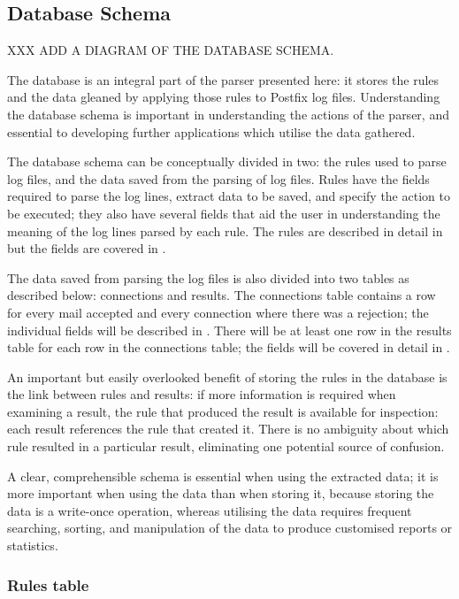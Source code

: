 \subsection{Database Schema}
\label{database schema}

XXX ADD A DIAGRAM OF THE DATABASE SCHEMA\@.

The database is an integral part of the parser presented here: it stores
the rules and the data gleaned by applying those rules to Postfix log
files.  Understanding the database schema is important in understanding the
actions of the parser, and essential to developing further applications
which utilise the data gathered.

The database schema can be conceptually divided in two: the rules used to
parse log files, and the data saved from the parsing of log files.  Rules
have the fields required to parse the log lines, extract data to be saved,
and specify the action to be executed; they also have several fields that
aid the user in understanding the meaning of the log lines parsed by each
rule.  The rules are described in detail in  but the
fields are covered in .

The data saved from parsing the log files is also divided into two tables
as described below: connections and results.  The connections table
contains a row for every mail accepted and every connection where there was
a rejection; the individual fields will be described in
.  There will be at least one row in the
results table for each row in the connections table; the fields will be
covered in detail in .

An important but easily overlooked benefit of storing the rules in the
database is the link between rules and results: if more information is
required when examining a result, the rule that produced the result is
available for inspection: each result references the rule that created it.
There is no ambiguity about which rule resulted in a particular result,
eliminating one potential source of confusion.

A clear, comprehensible schema is essential when using the extracted data;
it is more important when using the data than when storing it, because
storing the data is a write-once operation, whereas utilising the data
requires frequent searching, sorting, and manipulation of the data to
produce customised reports or statistics.

\subsubsection{Rules table}

